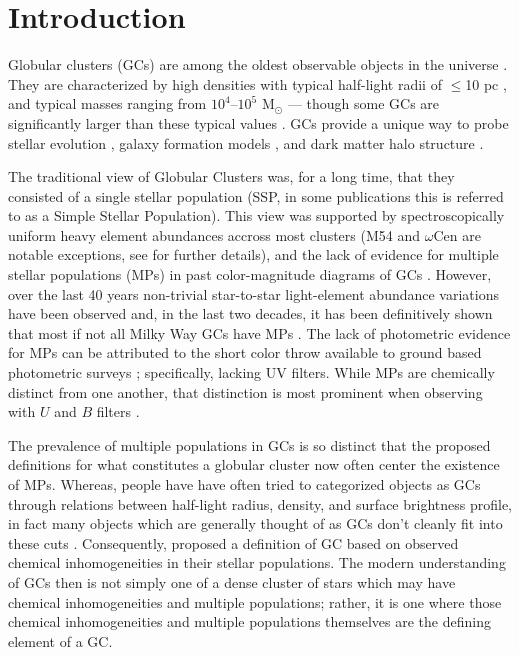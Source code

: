 \section{Introduction}\label{sec:Intro}
Globular clusters (GCs) are among the oldest observable objects in the
universe \citep{Pen11}. They are characterized by high densities with typical
half-light radii of $\le$10 pc \citep{Vanderburg2010}, and typical masses
ranging from $10^{4}$--$10^{5}$ M$_{\odot}$ \citep{Bro06} --- though some GCs
are significantly larger than these typical values \citep[e.g. $\omega$Cen, ][]{Richer1991}. GCs
provide a unique way to probe stellar evolution \citep{Bau03}, galaxy formation
models \citep{Boy18,Kra05}, and dark matter halo structure \citep{Hud18}.

The traditional view of Globular Clusters was, for a long time, that they
consisted of a single stellar population (SSP, in some publications this is
referred to as a Simple Stellar Population). This view was supported by
spectroscopically uniform heavy element abundances \citep{Carretta2010, Bastian2018} accross most clusters (M54 and $\omega$Cen are notable exceptions, see \citet{Marino2015} for further details), and the lack of evidence for multiple stellar populations
(MPs) in past color-magnitude diagrams of GCs \citep[i.e.][]{Sandage1953, Alcaino1975}. However, over the last 40 years non-trivial star-to-star light-element abundance variations have been observed \citep[i.e.][]{Smith1987} and, in
the last two decades, it has been definitively shown that most if not all Milky
Way GCs have MPs \citep{Gratton2004, Gratton2012, Piotto2015}. The lack of photometric evidence for MPs
can be attributed to the short color throw available to ground based
photometric surveys \citep{Milone2017}; specifically, lacking UV filters. While MPs are chemically distinct
from one another, that distinction is most prominent when observing with $U$
and $B$ filters \citep{Sbordone2011}.

The prevalence of multiple populations in GCs is so distinct that the proposed
definitions for what constitutes a globular cluster now often center the
existence of MPs. Whereas, people have have often tried to categorized objects
as GCs through relations between half-light radius, density, and surface
brightness profile, in fact many objects which are generally thought of as GCs
don't cleanly fit into these cuts \citep{Peebles1968, Brown1991, Brown1995, Bekki2002}.
Consequently, \citet{Carretta2010} proposed a definition of GC based on
observed chemical inhomogeneities in their stellar populations. The modern
understanding of GCs then is not simply one of a dense cluster of stars which
may have chemical inhomogeneities and multiple populations; rather, it is one
where those chemical inhomogeneities and multiple populations themselves are
the defining element of a GC.

